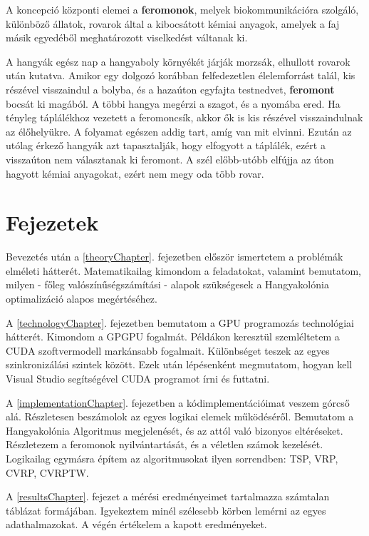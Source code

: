 A koncepció központi elemei a \textbf{feromonok}, melyek biokommunikációra szolgáló, különböző állatok, rovarok által a kibocsátott kémiai anyagok, amelyek a faj másik egyedéből meghatározott viselkedést váltanak ki.

A hangyák egész nap a hangyaboly környékét járják morzsák, elhullott rovarok után kutatva. Amikor egy dolgozó korábban felfedezetlen élelemforrást talál, kis részével visszaindul a bolyba, és a hazaúton egyfajta testnedvet, \textbf{feromont} bocsát ki magából. A többi hangya megérzi a szagot, és a nyomába ered. Ha tényleg táplálékhoz vezetett a feromoncsík, akkor ők is kis részével visszaindulnak az élőhelyükre. A folyamat egészen addig tart, amíg van mit elvinni. Ezután az utólag érkező hangyák azt tapasztalják, hogy elfogyott a táplálék, ezért a visszaúton nem választanak ki feromont. A szél előbb-utóbb elfújja az úton hagyott kémiai anyagokat, ezért nem megy oda több rovar.

\section{Fejezetek}
Bevezetés után a \ref{theoryChapter}. fejezetben először ismertetem a problémák elméleti hátterét. Matematikailag kimondom a feladatokat, valamint bemutatom, milyen - főleg valószínűségszámítási - alapok szükségesek a Hangyakolónia optimalizáció alapos megértéséhez.

A \ref{technologyChapter}. fejezetben bemutatom a GPU programozás technológiai hátterét. Kimondom a GPGPU fogalmát. Példákon keresztül szemléltetem a CUDA szoftvermodell markánsabb fogalmait. Különbséget teszek az egyes szinkronizálási szintek között. Ezek után lépésenként megmutatom, hogyan kell Visual Studio segítségével CUDA programot írni és futtatni.

A \ref{implementationChapter}. fejezetben a kódimplementációimat veszem górcső alá. Részletesen beszámolok az egyes logikai elemek működéséről. Bemutatom a Hangyakolónia Algoritmus megjelenését, és az attól való bizonyos eltéréseket. Részletezem a feromonok nyilvántartását, és a véletlen számok kezelését. Logikailag egymásra építem az algoritmusokat ilyen sorrendben: TSP, VRP, CVRP, CVRPTW.

A \ref{resultsChapter}. fejezet a mérési eredményeimet tartalmazza számtalan táblázat formájában. Igyekeztem minél szélesebb körben lemérni az egyes adathalmazokat. A végén értékelem a kapott eredményeket. 

